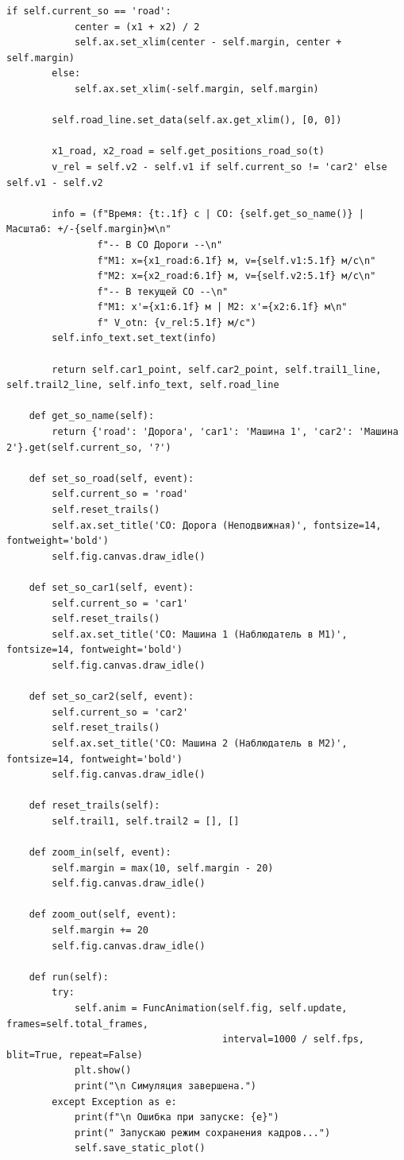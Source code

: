 \documentclass[12pt,a4paper]{article}
\begin{document}
\begin{lstlisting}[caption={Основной код симуляции (main.py)}, label={lst:main}]
        if self.current_so == 'road':
            center = (x1 + x2) / 2
            self.ax.set_xlim(center - self.margin, center + self.margin)
        else:
            self.ax.set_xlim(-self.margin, self.margin)

        self.road_line.set_data(self.ax.get_xlim(), [0, 0])

        x1_road, x2_road = self.get_positions_road_so(t)
        v_rel = self.v2 - self.v1 if self.current_so != 'car2' else self.v1 - self.v2

        info = (f"Время: {t:.1f} с | СО: {self.get_so_name()} | Масштаб: +/-{self.margin}м\n"
                f"-- В СО Дороги --\n"
                f"M1: x={x1_road:6.1f} м, v={self.v1:5.1f} м/с\n"
                f"M2: x={x2_road:6.1f} м, v={self.v2:5.1f} м/с\n"
                f"-- В текущей СО --\n"
                f"M1: x'={x1:6.1f} м | M2: x'={x2:6.1f} м\n"
                f" V_otn: {v_rel:5.1f} м/с")
        self.info_text.set_text(info)

        return self.car1_point, self.car2_point, self.trail1_line, self.trail2_line, self.info_text, self.road_line

    def get_so_name(self):
        return {'road': 'Дорога', 'car1': 'Машина 1', 'car2': 'Машина 2'}.get(self.current_so, '?')

    def set_so_road(self, event):
        self.current_so = 'road'
        self.reset_trails()
        self.ax.set_title('СО: Дорога (Неподвижная)', fontsize=14, fontweight='bold')
        self.fig.canvas.draw_idle()

    def set_so_car1(self, event):
        self.current_so = 'car1'
        self.reset_trails()
        self.ax.set_title('СО: Машина 1 (Наблюдатель в М1)', fontsize=14, fontweight='bold')
        self.fig.canvas.draw_idle()

    def set_so_car2(self, event):
        self.current_so = 'car2'
        self.reset_trails()
        self.ax.set_title('СО: Машина 2 (Наблюдатель в М2)', fontsize=14, fontweight='bold')
        self.fig.canvas.draw_idle()

    def reset_trails(self):
        self.trail1, self.trail2 = [], []

    def zoom_in(self, event):
        self.margin = max(10, self.margin - 20)
        self.fig.canvas.draw_idle()

    def zoom_out(self, event):
        self.margin += 20
        self.fig.canvas.draw_idle()

    def run(self):
        try:
            self.anim = FuncAnimation(self.fig, self.update, frames=self.total_frames,
                                      interval=1000 / self.fps, blit=True, repeat=False)
            plt.show()
            print("\n Симуляция завершена.")
        except Exception as e:
            print(f"\n Ошибка при запуске: {e}")
            print(" Запускаю режим сохранения кадров...")
            self.save_static_plot()


\end{lstlisting}
\end{document}
